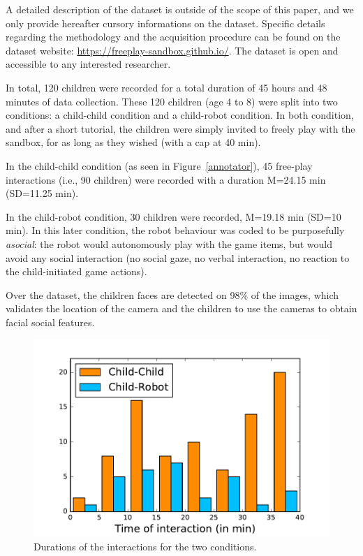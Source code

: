 \documentclass[sigconf]{acmart}
\newcommand{\ie}{i.e.,\xspace}
\begin{document}
A detailed description of the dataset is outside of the scope of this paper, and
we only provide hereafter cursory informations on the dataset. Specific details
regarding the methodology and the acquisition procedure can be found on the
dataset website: \url{https://freeplay-sandbox.github.io/}. The dataset is open and accessible
to any interested researcher.

In total, 120 children were recorded for a total duration of 45 hours and 48
minutes of data collection. These 120 children (age 4 to 8) were split into two
conditions: a child-child condition and a child-robot condition. In both
condition, and after a short tutorial, the children were simply invited to
freely play with the sandbox, for as long as they wished (with a cap at 40 min).

In the child-child condition (as seen in Figure~\ref{annotator}), 45 free-play interactions (\ie 90 children) were
recorded with a duration M=24.15 min (SD=11.25 min).

In the child-robot condition, 30 children were recorded, M=19.18 min (SD=10
min). In this later condition, the robot
behaviour was coded to be purposefully \emph{asocial}: the robot would autonomously play with
the game items, but would avoid any social interaction (no social gaze, no
verbal interaction, no reaction to the child-initiated game actions).

Over the dataset, the children faces are detected on 98\% of the images, which
validates the location of the camera and the children to use the cameras to obtain
facial social features.

\begin{figure}
    \centering
    \includegraphics[width=0.9\columnwidth]{durations}
    \caption{Durations of the interactions for the two conditions.}

    \label{fig|durations}
\end{figure}
\end{document}

